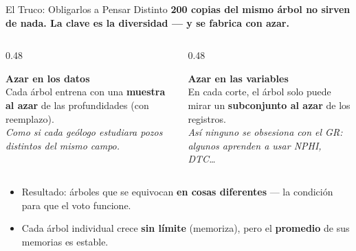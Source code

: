 \documentclass[aspectratio=169, 11pt]{beamer}
\begin{document}
\begin{frame}[shrink=8]{El Truco: Obligarlos a Pensar Distinto}
  \vspace{-4pt}
  {\small\color{arcaDark}\bfseries
    200 copias del mismo árbol no sirven de nada. La clave es la \textbf{diversidad} --- y se fabrica con azar.}

  \vspace{8pt}
  \begin{columns}[T]
    \begin{column}{0.48\textwidth}
      \begin{tcolorbox}[colback=arcaGray, colframe=arcaRed, boxrule=0pt, leftrule=3pt,
        arc=3pt, left=6pt, right=6pt, top=5pt, bottom=5pt]
        {\scriptsize\color{arcaRed}\bfseries\faDatabase\hspace{4pt}Azar en los datos}\\[4pt]
        {\scriptsize\color{textMuted}
          Cada árbol entrena con una \textbf{muestra al azar}
          de las profundidades (con reemplazo).\\[3pt]
          \itshape Como si cada geólogo estudiara pozos
          distintos del mismo campo.}
      \end{tcolorbox}
    \end{column}
    \begin{column}{0.48\textwidth}
      \begin{tcolorbox}[colback=arcaGray, colframe=codeBlue, boxrule=0pt, leftrule=3pt,
        arc=3pt, left=6pt, right=6pt, top=5pt, bottom=5pt]
        {\scriptsize\color{codeBlue}\bfseries\faRandom\hspace{4pt}Azar en las variables}\\[4pt]
        {\scriptsize\color{textMuted}
          En cada corte, el árbol solo puede mirar un
          \textbf{subconjunto al azar} de los registros.\\[3pt]
          \itshape Así ninguno se obsesiona con el GR:
          algunos aprenden a usar NPHI, DTC\ldots}
      \end{tcolorbox}
    \end{column}
  \end{columns}

  \vspace{10pt}
  {\footnotesize\color{textMuted}
  \begin{itemize}\setlength{\itemsep}{3pt}
    \item[{\color{codeGreen}\scriptsize\faCheck}]
      Resultado: árboles que se equivocan \textbf{en cosas diferentes} ---
      la condición para que el voto funcione.
    \item[{\color{arcaRed}\scriptsize\faArrowRight}]
      Cada árbol individual crece \textbf{sin límite} (memoriza), pero el
      \textbf{promedio} de sus memorias es estable.
  \end{itemize}
  }
\end{frame}
\end{document}
